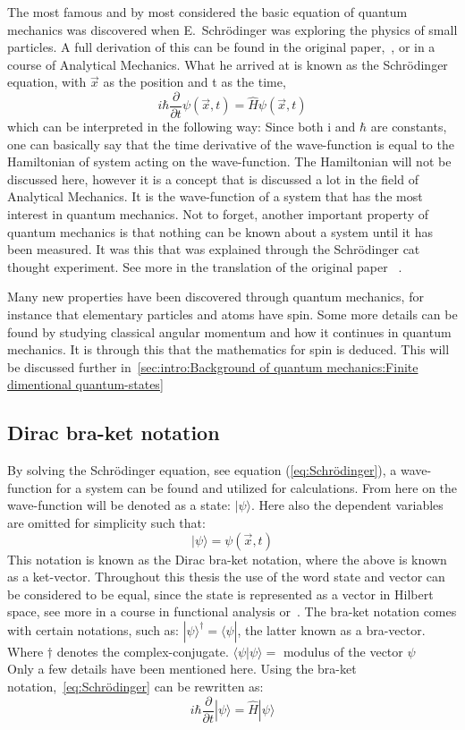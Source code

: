 \documentclass[
  utf8,%
  parskip,%
  largesmallcaps,intlimits,widermath,%
  sharecounter,nobreak,definition=marks,%
  noparts%
]{rtthesis}
\begin{document}
The most famous and by most considered the basic equation of quantum mechanics was discovered when E.\ Schrödinger was exploring the physics of small particles. A full derivation of this can be found in the original paper,~\cite{Schrodinger:1926}, or in a course of Analytical Mechanics. What he arrived at is known as the Schrödinger equation, with $\vec{x}$ as the position and t as the time, 
\begin{equation} \label{eq:Schrödinger}
i\hbar\frac{\partial}{\partial t}\psi (\vec{x}, t) = \hat{H}\psi (\vec{x}, t)
\end{equation}
which can be interpreted in the following way:
Since both i and $\hbar$ are constants, one can basically say that the time derivative of the wave-function is equal to the Hamiltonian of system acting on the wave-function. The Hamiltonian will not be discussed here, however it is a concept that is discussed a lot in the field of Analytical Mechanics.
It is the wave-function of a system that has the most interest in quantum mechanics. 
Not to forget, another important property of quantum mechanics is that nothing can be known about a system until it has been measured. It was this that was explained through the Schrödinger cat thought experiment. See more in the translation of the original paper ~\cite{Schrodinger:1980}.

Many new properties have been discovered through quantum mechanics, for instance that elementary particles and atoms have spin. Some more details can be found by studying classical angular momentum and how it continues in quantum mechanics. It is through this that the mathematics for spin is deduced. This will be discussed further in~\ref{sec:intro:Background of quantum mechanics:Finite dimentional quantum-states}
\subsection{Dirac bra-ket notation}\label{subsec:Dirac bra-ket notation}
By solving the Schrödinger equation, see equation (\ref{eq:Schrödinger}), a wave-function for a system can be found and utilized for calculations. From here on the wave-function will be denoted as a state: $|\psi\rangle$.
Here also the dependent variables are omitted for simplicity such that:
$$|\psi\rangle = \psi (\vec{x}, t)$$
This notation is known as the Dirac bra-ket notation, where the above is known as a ket-vector. Throughout this thesis the use of the word state and vector can be considered to be equal, since the state is represented as a vector in Hilbert space, see more in a course in functional analysis or~\cite{Kreyzig}. The bra-ket notation comes with certain notations, such as: $|\psi\rangle^\dagger = \langle\psi|$, the latter known as a bra-vector. Where $\dagger$ denotes the complex-conjugate. $\langle\psi|\psi\rangle =$ modulus of the vector $\psi$\\
Only a few details have been mentioned here. Using the bra-ket notation,~\ref{eq:Schrödinger} can be rewritten as: \begin{equation} \label{eq:Schrödinger2}
i\hbar\frac{\partial}{\partial t}|\psi\rangle = \hat{H}|\psi\rangle
\end{equation}
\end{document}

